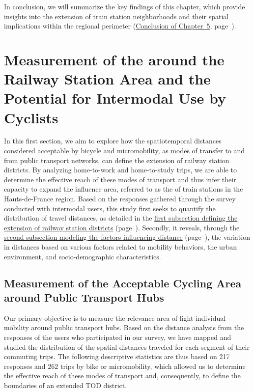 \begin{refsegment}
In conclusion, we will summarize the key findings of this chapter, which provide insights into the extension of train station neighborhoods and their spatial implications within the regional perimeter (\hyperref[chap5:conclusion]{Conclusion of Chapter~5}, page~\pageref{chap5:conclusion}).%

\newpage
{} %
\section{Measurement of the  around the Railway Station Area and the Potential for Intermodal Use by Cyclists
    \label{chap5:aire-secondaire-quartier-gare}
    }

In this first section, we aim to explore how the spatiotemporal distances considered acceptable by \gls{bicycle} and \gls{micromobility}, as modes of transfer to and from public transport networks, can define the extension of railway station districts. By analyzing home-to-work and home-to-study trips, we are able to determine the effective reach of these modes of transport and thus infer their capacity to expand the influence area, referred to as the  of train stations in the Hauts-de-France region. Based on the responses gathered through the survey conducted with intermodal users, this study first seeks to quantify the distribution of travel distances, as detailed in the \hyperref[chap5:aire-cyclable-micromobilite]{first subsection defining the extension of railway station districts} (page~\pageref{chap5:aire-cyclable-micromobilite}). Secondly, it reveals, through the \hyperref[chap5:regression-distances]{second subsection modeling the factors influencing distance} (page~\pageref{chap5:regression-distances}), the variation in distances based on various factors related to mobility behaviors, the urban environment, and socio-demographic characteristics.%

\subsection{Measurement of the Acceptable Cycling Area around Public Transport Hubs
    \label{chap5:aire-cyclable-micromobilite}
    }

Our primary objective is to measure the relevance area of light individual mobility around public transport hubs. Based on the distance analysis from the responses of the users who participated in our survey, we have mapped and studied the distribution of the spatial distances traveled for each segment of their commuting trips. The following descriptive statistics are thus based on 217 responses and 262 trips by bike or micromobility, which allowed us to determine the effective reach of these modes of transport and, consequently, to define the boundaries of an extended \acrshort{TOD} district.%


\end{refsegment}
